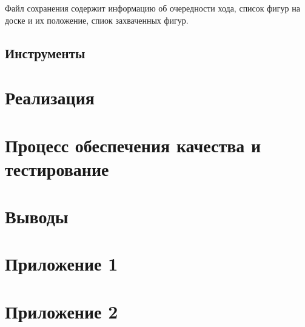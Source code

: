 

Файл сохранения содержит информацию об очередности хода, список фигур на доске и их положение, спиок захваченных фигур.

\subsection{Инструменты}

\section{Реализация}


\section{Процесс обеспечения качества и тестирование}


\section{Выводы}


\section{Приложение 1}

\section{Приложение 2}

